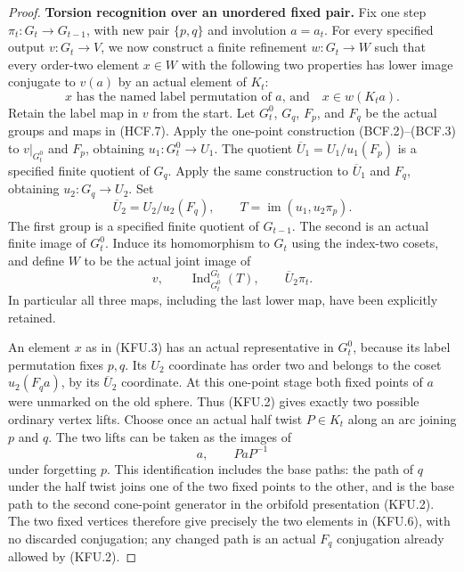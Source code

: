 \begin{proof}
\par\medskip\noindent\textbf{Torsion recognition over an unordered fixed pair.}\quad
Fix one step $\pi_t:G_t\to G_{t-1}$, with new pair
$\{p,q\}$ and involution $a=a_t$.
For every specified output $v:G_t\to V$, we now construct
a finite refinement $w:G_t\to W$ such that every
order-two element $x\in W$ with the following two
properties has lower image conjugate to $v(a)$ by an
actual element of $K_t$:
\[
 \text{$x$ has the named label permutation of $a$, and}
 \quad x\in w(K_ta).                                    \tag{KFU.3}
\]
Retain the label map in $v$ from the start.
Let $G_t^0$, $G_q$, $F_p$, and $F_q$ be the actual groups
and maps in (HCF.7).
Apply the one-point construction (BCF.2)--(BCF.3) to
$v|_{G_t^0}$ and $F_p$, obtaining $u_1:G_t^0\to U_1$.
The quotient $\overline U_1=U_1/u_1(F_p)$ is a specified
finite quotient of $G_q$.
Apply the same construction to $\overline U_1$ and $F_q$,
obtaining $u_2:G_q\to U_2$.
Set
\[
 \overline U_2=U_2/u_2(F_q),\qquad
 T=\operatorname{im}(u_1,u_2\pi_p).
                                                               \tag{KFU.4}
\]
The first group is a specified finite quotient of
$G_{t-1}$.  The second is an actual finite image of
$G_t^0$.  Induce its homomorphism to $G_t$ using the
index-two cosets, and define $W$ to be the actual joint
image of
\[
       v,\qquad \operatorname{Ind}_{G_t^0}^{G_t}(T),
                    \qquad \overline U_2\pi_t.          \tag{KFU.5}
\]
In particular all three maps, including the last lower
map, have been explicitly retained.

An element $x$ as in (KFU.3) has an actual representative
in $G_t^0$, because its label permutation fixes $p,q$.
Its $U_2$ coordinate has order two and belongs to the
coset $u_2(F_q a)$, by its $\overline U_2$ coordinate.
At this one-point stage both fixed points of $a$ were
unmarked on the old sphere.  Thus (KFU.2) gives exactly
two possible ordinary vertex lifts.  Choose once an
actual half twist $P\in K_t$ along an arc joining $p$
and $q$.  The two lifts can be taken as the images of
\[
                         a,\qquad PaP^{-1}             \tag{KFU.6}
\]
under forgetting $p$.  This identification includes the
base paths: the path of $q$ under the half twist joins
one of the two fixed points to the other, and is the
base path to the second cone-point generator in the
orbifold presentation (KFU.2).  The two fixed vertices
therefore give precisely the two elements in (KFU.6),
with no discarded conjugation; any changed path is
an actual $F_q$ conjugation already allowed by (KFU.2).


\end{proof}
